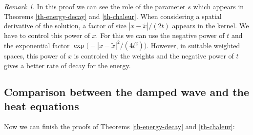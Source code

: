 \documentclass[10pt, a4paper,reqno]{amsart}
\theoremstyle{plain}
\theoremstyle{definition}
\theoremstyle{remark}
\newtheorem{remark}[theorem]{Remark}
\begin{document}
\begin{remark} \label{rem-s}
In this proof we can see the role of the parameter $s$ which appears in Theorems \ref{th-energy-decay} and \ref{th-chaleur}. When considering a spatial derivative of the solution, a factor of size ${\left\vert {x-\tilde x}\right\vert}/(2t)$ appears in the kernel. We have to control this power of $x$. For this we can use the negative power of $t$ and the exponential factor $\exp \big(-{\left\vert {x -\tilde x}\right\vert}^2/(4t^2)\big)$. However, in suitable weighted spaces, this power of $x$ is controled by the weights and the negative power of $t$ gives a better rate of decay for the energy.
\end{remark}

\subsection{Comparison between the damped wave and the heat equations} \label{sec-decay-difference}

Now we can finish the proofs of Theorems \ref{th-energy-decay} and \ref{th-chaleur}:
\end{document}
